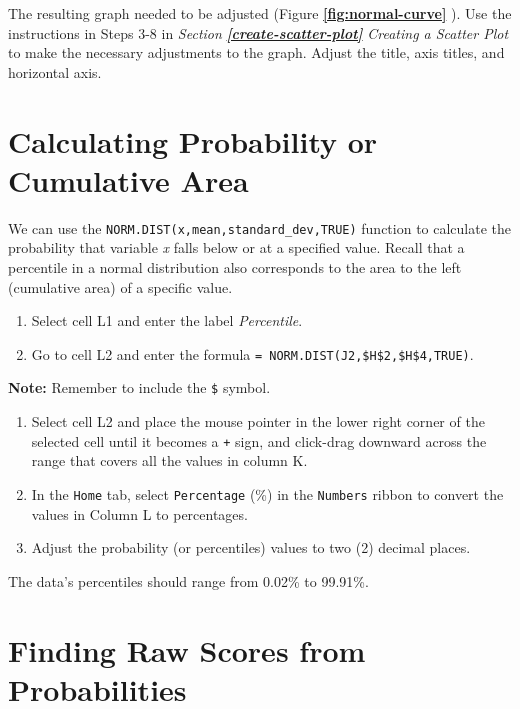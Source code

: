 \documentclass[
]{book}
\providecommand{\tightlist}{%
  \setlength{\itemsep}{0pt}\setlength{\parskip}{0pt}}
\begin{document}
The resulting graph needed to be adjusted (Figure \textbf{\ref{fig:normal-curve}
}). Use the instructions in Steps 3-8 in \emph{Section} \textbf{\emph{\ref{create-scatter-plot}}} \emph{Creating a Scatter Plot} to make the necessary adjustments to the graph. Adjust the title, axis titles, and horizontal axis.

\hypertarget{calculating-probability-or-cumulative-area}{%
\section{Calculating Probability or Cumulative Area}\label{calculating-probability-or-cumulative-area}}

We can use the \texttt{NORM.DIST(x,mean,standard\_dev,TRUE)} function to calculate the probability that variable \emph{x} falls below or at a specified value. Recall that a percentile in a normal distribution also corresponds to the area to the left (cumulative area) of a specific value.

\begin{enumerate}
\def\labelenumi{\arabic{enumi}.}
\tightlist
\item
  Select cell L1 and enter the label \emph{Percentile}.
\item
  Go to cell L2 and enter the formula \texttt{=\ NORM.DIST(J2,\$H\$2,\$H\$4,TRUE)}.
\end{enumerate}

\textbf{Note:} Remember to include the \texttt{\$} symbol.

\begin{enumerate}
\def\labelenumi{\arabic{enumi}.}
\setcounter{enumi}{2}
\tightlist
\item
  Select cell L2 and place the mouse pointer in the lower right corner of the selected cell until it becomes a \texttt{+} sign, and click-drag downward across the range that covers all the values in column K.
\item
  In the \texttt{Home} tab, select \texttt{Percentage} (\%) in the \texttt{Numbers} ribbon to convert the values in Column L to percentages.
\item
  Adjust the probability (or percentiles) values to two (2) decimal places.
\end{enumerate}

The data's percentiles should range from 0.02\% to 99.91\%.

\hypertarget{finding-raw-scores-from-probabilities}{%
\section{Finding Raw Scores from Probabilities}\label{finding-raw-scores-from-probabilities}}
\end{document}
